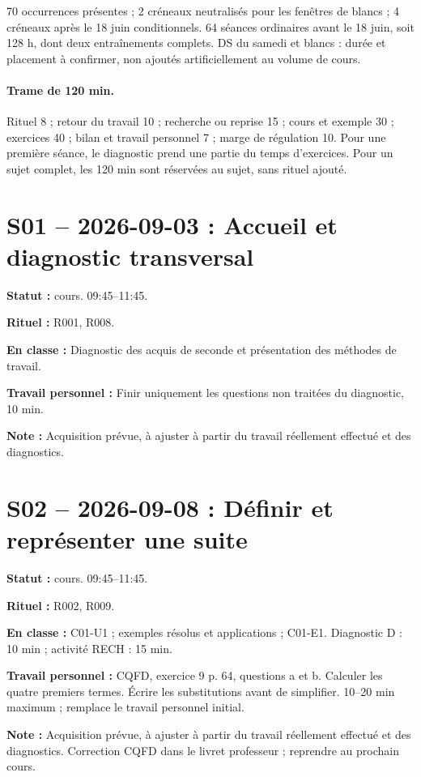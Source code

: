\label{ANNUEL}
70 occurrences présentes ; 2 créneaux neutralisés pour les fenêtres de blancs ; 4 créneaux après le 18 juin conditionnels. 64 séances ordinaires avant le 18 juin, soit 128 h, dont deux entraînements complets. DS du samedi et blancs : durée et placement à confirmer, non ajoutés artificiellement au volume de cours.
\paragraph{Trame de 120 min.} Rituel 8 ; retour du travail 10 ; recherche ou reprise 15 ; cours et exemple 30 ; exercices 40 ; bilan et travail personnel 7 ; marge de régulation 10. Pour une première séance, le diagnostic prend une partie du temps d’exercices. Pour un sujet complet, les 120 min sont réservées au sujet, sans rituel ajouté.
\section*{S01 -- 2026-09-03 : Accueil et diagnostic transversal}
\textbf{Statut :} cours. 09:45–11:45.\par\textbf{Rituel :} R001, R008.\par\textbf{En classe :} Diagnostic des acquis de seconde et présentation des méthodes de travail.\par\textbf{Travail personnel :} Finir uniquement les questions non traitées du diagnostic, 10 min.\par\textbf{Note :} Acquisition prévue, à ajuster à partir du travail réellement effectué et des diagnostics.
\section*{S02 -- 2026-09-08 : Définir et représenter une suite}
\textbf{Statut :} cours. 09:45–11:45.\par\textbf{Rituel :} R002, R009.\par\textbf{En classe :} C01-U1 ; exemples résolus et applications ; C01-E1. Diagnostic D : 10 min ; activité RECH : 15 min.\par\textbf{Travail personnel :} CQFD, exercice 9 p. 64, questions a et b. Calculer les quatre premiers termes. Écrire les substitutions avant de simplifier. 10–20 min maximum ; remplace le travail personnel initial.\par\textbf{Note :} Acquisition prévue, à ajuster à partir du travail réellement effectué et des diagnostics. Correction CQFD dans le livret professeur ; reprendre au prochain cours.
